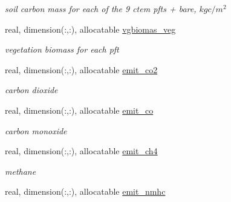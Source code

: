\begin{DoxyCompactItemize}
\begin{DoxyCompactList}\small\item\em soil carbon mass for each of the 9 ctem pfts + bare, $kg c/m^2$ \end{DoxyCompactList}\item 
\hypertarget{structctem__statevars_1_1veg__gat_ab5e6fb1a7fe746e4f79086cf516f486f}{}real, dimension(\+:,\+:), allocatable \hyperlink{structctem__statevars_1_1veg__gat_ab5e6fb1a7fe746e4f79086cf516f486f}{vgbiomas\+\_\+veg}\label{structctem__statevars_1_1veg__gat_ab5e6fb1a7fe746e4f79086cf516f486f}

\begin{DoxyCompactList}\small\item\em vegetation biomass for each pft \end{DoxyCompactList}\item 
\hypertarget{structctem__statevars_1_1veg__gat_a3c0874ca6e5215438a569e6bd136865a}{}real, dimension(\+:,\+:), allocatable \hyperlink{structctem__statevars_1_1veg__gat_a3c0874ca6e5215438a569e6bd136865a}{emit\+\_\+co2}\label{structctem__statevars_1_1veg__gat_a3c0874ca6e5215438a569e6bd136865a}

\begin{DoxyCompactList}\small\item\em carbon dioxide \end{DoxyCompactList}\item 
\hypertarget{structctem__statevars_1_1veg__gat_a342d1e23f24d9283196bca9111f61c49}{}real, dimension(\+:,\+:), allocatable \hyperlink{structctem__statevars_1_1veg__gat_a342d1e23f24d9283196bca9111f61c49}{emit\+\_\+co}\label{structctem__statevars_1_1veg__gat_a342d1e23f24d9283196bca9111f61c49}

\begin{DoxyCompactList}\small\item\em carbon monoxide \end{DoxyCompactList}\item 
\hypertarget{structctem__statevars_1_1veg__gat_a6515c41e7fe48a1946fd70fe0869fc82}{}real, dimension(\+:,\+:), allocatable \hyperlink{structctem__statevars_1_1veg__gat_a6515c41e7fe48a1946fd70fe0869fc82}{emit\+\_\+ch4}\label{structctem__statevars_1_1veg__gat_a6515c41e7fe48a1946fd70fe0869fc82}

\begin{DoxyCompactList}\small\item\em methane \end{DoxyCompactList}\item 
\hypertarget{structctem__statevars_1_1veg__gat_a26d81115331aebd062e51aecfee347e5}{}real, dimension(\+:,\+:), allocatable \hyperlink{structctem__statevars_1_1veg__gat_a26d81115331aebd062e51aecfee347e5}{emit\+\_\+nmhc}\label{structctem__statevars_1_1veg__gat_a26d81115331aebd062e51aecfee347e5}


\end{DoxyCompactItemize}
